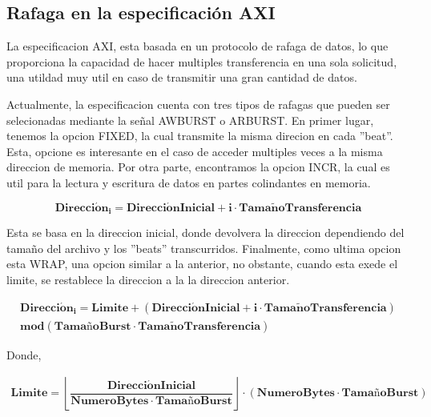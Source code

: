\documentclass[11pt,spanish,listoffigures,listoftables]{tfgetsinf}
\begin{document}
      \subsection{ Rafaga en la especificación AXI }

      La especificacion AXI, esta basada en un protocolo de rafaga de datos, lo
      que proporciona la capacidad de hacer multiples transferencia en una sola
      solicitud, una utildad muy util en caso de transmitir una gran cantidad de
      datos.

      Actualmente, la especificacion cuenta con tres tipos de rafagas que pueden
      ser selecionadas mediante la señal AWBURST o ARBURST. En primer lugar,
      tenemos la opcion FIXED, la cual transmite la misma direcion en cada
      ''beat''. Esta, opcione es interesante en el caso de acceder multiples
      veces a la misma direccion de memoria. Por otra parte, encontramos la
      opcion INCR, la cual es util para la lectura y escritura de datos en
      partes colindantes en memoria.

         \begin{center}
            \begin{equation}
               \mathbf{Direcci\acute{o}n_i = Direcci\acute{o}nInicial + i \cdot Tama \tilde{n}oTransferencia}
            \end{equation}
         \end{center}

      Esta se basa en la direccion inicial, donde devolvera la direccion
      dependiendo del tamaño del archivo y los ''beats'' transcurridos.
      Finalmente, como ultima opcion esta WRAP, una opcion similar a la
      anterior, no obstante, cuando esta exede el limite, se restablece la
      direccion a la la direccion anterior.
        
            \begin{equation}
               \begin{split}
                  \mathbf{Direcci\acute{o}n_i = Limite + (Direcci\acute{o}nInicial + i \cdot Tama \tilde{n}oTransferencia)} \\
                  \mathbf{mod (TamañoBurst \cdot Tama \tilde{n}oTransferencia)}
               \end{split}
            \end{equation}
      
      Donde, 

         \begin{center}
            \begin{equation}
               \begin{split}
                  \mathbf{Limite =  \left\lfloor\dfrac{Direcci\acute{o}nInicial}{NumeroBytes \cdot TamañoBurst}\right\rfloor  \cdot (NumeroBytes \cdot TamañoBurst)}
               \end{split}
            \end{equation}
         \end{center}
\end{document}
